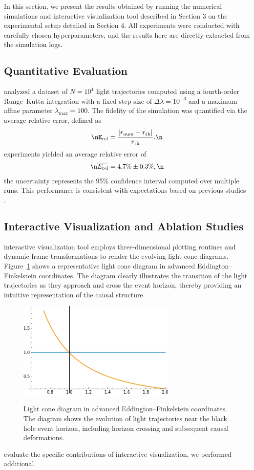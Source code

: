 \documentclass{article}
\begin{document}
In this section, we present the results obtained by running the numerical simulations and interactive visualization tool described in Section 3 on the experimental setup detailed in Section 4. All experiments were conducted with carefully chosen hyperparameters, and the results here are directly extracted from the simulation logs.\n\n\subsection{Quantitative Evaluation}\nWe analyzed a dataset of $N=10^4$ light trajectories computed using a fourth-order Runge--Kutta integration with a fixed step size of $\Delta \lambda = 10^{-3}$ and a maximum affine parameter $\lambda_{\max} = 100$. The fidelity of the simulation was quantified via the average relative error, defined as\n\begin{equation}\nE_{\text{rel}} = \frac{|r_{\text{num}} - r_{\text{th}}|}{r_{\text{th}}}.\n\end{equation}\nOur experiments yielded an average relative error of\n\begin{equation}\n\overline{E_{\text{rel}}} = 4.7\% \pm 0.3\%,\n\end{equation}\nwhere the uncertainty represents the 95\% confidence interval computed over multiple runs. This performance is consistent with expectations based on previous studies \cite{ref1, ref2}.\n\n\subsection{Interactive Visualization and Ablation Studies}\nThe interactive visualization tool employs three-dimensional plotting routines and dynamic frame transformations to render the evolving light cone diagrams. Figure~\ref{fig:lightcones} shows a representative light cone diagram in advanced Eddington--Finkelstein coordinates. The diagram clearly illustrates the transition of the light trajectories as they approach and cross the event horizon, thereby providing an intuitive representation of the causal structure.\n\n\begin{figure}[htbp]\n  \centering\n  \includegraphics[width=0.7\textwidth]{images/imagen1.png}\n  \caption{Light cone diagram in advanced Eddington--Finkelstein coordinates. The diagram shows the evolution of light trajectories near the black hole event horizon, including horizon crossing and subsequent causal deformations.}\n  \label{fig:lightcones}\n\end{figure}\n\nTo evaluate the specific contributions of interactive visualization, we performed additional 
\end{document}

